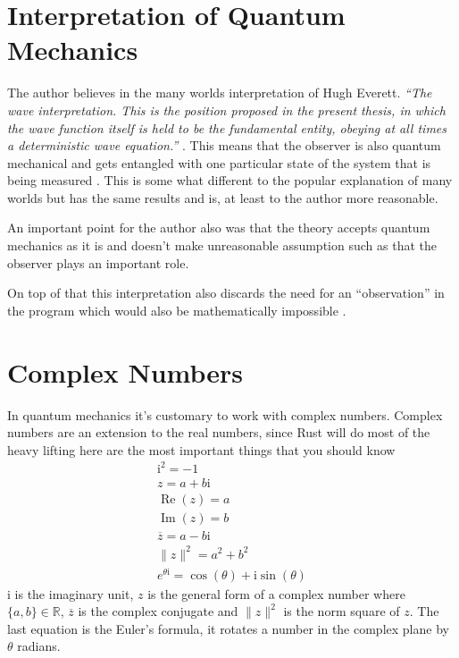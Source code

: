 \documentclass[11pt,DIV=10,final]{scrreprt} %
\newcommand{\mi}{{\text{i}}}
\newcommand{\compconj}[1]{%
  \overline{#1}%
}
\begin{document}
\section{Interpretation of Quantum Mechanics}
The author believes in the many worlds interpretation of Hugh Everett. \emph{``The wave interpretation. This is the position proposed in the present thesis, in which the wave function itself is held to be
the fundamental entity, obeying at all times a deterministic wave equation.''} \citep[p. 115]{dewitt2015many}. This means that the observer is also quantum mechanical and gets entangled with one particular
state of the system that is being measured \citep[p. 116]{dewitt2015many}. This is some what different to the popular explanation of many worlds but has the same results and is, at least to the author
more reasonable.

An important point for the author also was that the theory accepts quantum mechanics as it is and doesn't make unreasonable assumption such as that the observer plays an important role.

On top of that this interpretation also discards the need for an ``observation'' in the program which would also be mathematically impossible \citep[p. 111]{dewitt2015many}.


\section{Complex Numbers}
In quantum mechanics it's customary to work with complex numbers. Complex numbers are an extension to the real numbers, since Rust will do most of the heavy lifting here are the most important things that you should know
\begin{align*}
  \mi^{2} = -1 \\
  z = a + b \mi \\
  \operatorname{Re}(z) = a \\
  \operatorname{Im}(z) = b \\
  \compconj{z} = a - b \mi \\
  \|z\|^{2} = a^{2} + b^{2} \\
  e^{\theta \mi} = \cos(\theta) + \mi \sin(\theta)
\end{align*}
$\mi$ is the imaginary unit,
$z$ is the general form of a complex number where $\{a,b\} \in \mathbb{R}$,
$\compconj{z}$ is the complex conjugate
and $\|z\|^{2}$ is the norm square of $z$.
The last equation is the Euler's formula, it rotates a number in the complex plane by $\theta$ radians.
\end{document}
